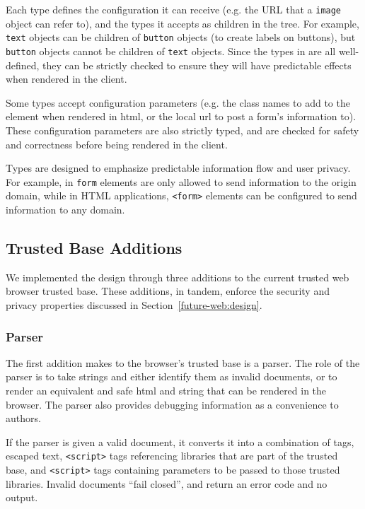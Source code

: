 Each type defines the configuration it can receive (e.g. the
URL that a \texttt{image} object can refer to), and the types it
accepts as children in the tree.  For example, \texttt{text} objects can be
children of \texttt{button} objects (to create labels on buttons), but
\texttt{button} objects cannot be children of \texttt{text} objects.
Since the types in \CDF are all well-defined, they can be strictly checked to
ensure they will have predictable effects when rendered in the client.

Some types accept configuration parameters (e.g. the class names to add to the
element when rendered in \gls{html}, or the local \gls{url} to post a form's
information to).  These configuration parameters are also strictly typed, and
are checked for safety and correctness before being rendered in the
client.

Types are designed to emphasize predictable information flow and user privacy.
For example, in \CDF \texttt{form} elements are only allowed to send information to
the origin domain, while in HTML applications, \texttt{<form>} elements
can be configured to send information to any domain.


\subsection{Trusted Base Additions}
We implemented the \CDF design through three additions to the current trusted
web browser trusted base.  These additions, in tandem, enforce the security and
privacy properties discussed in Section~\ref{future-web:design}.


\subsubsection{Parser}
The first addition \CDF makes to the browser's trusted base is a \CDF parser.
The role of the \CDF parser is to take strings and either identify them as
invalid \CDF documents, or to render an equivalent and safe \gls{html} and \JS
string that can be rendered in the browser. The parser also provides debugging
information as a convenience to \CDF authors.

If the parser is given a valid \CDF document, it converts it into a combination
of \HTML tags, escaped text, \texttt{<script>} tags referencing \JS libraries
that are part of the \CDF trusted base, and \texttt{<script>} tags containing
parameters to be passed to those trusted libraries.  Invalid documents
``fail closed'', and return an error code and no output.


